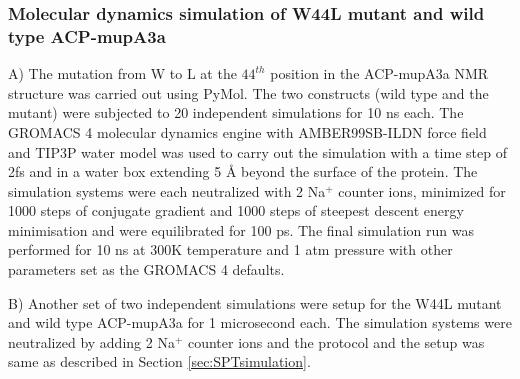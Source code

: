 			\subsubsection{Molecular dynamics simulation of W44L mutant and wild type ACP-mupA3a}
			\label{sec:WtoL_MD}
			A) The mutation from W to L at the $44^{th}$ position in the ACP-mupA3a NMR structure was carried out using PyMol. The two constructs (wild type and the mutant) were subjected to 20 independent simulations for 10 ns each. The GROMACS 4 \parencite{Hess2008a} molecular dynamics engine with AMBER99SB-ILDN \parencite{Lindorff-Larsen2010} force field and TIP3P water model was used to carry out the simulation with a time step of 2fs and in a water box extending 5 {\AA }  beyond the surface of the protein. The simulation systems were each neutralized with 2 Na$ ^{+} $ counter ions, minimized for 1000 steps of conjugate gradient and 1000 steps of steepest descent energy minimisation and were equilibrated for 100 ps. The final simulation run was performed for 10 ns at 300K temperature and 1 atm pressure with other parameters set as the GROMACS 4 defaults.
			
			B) Another set of two independent simulations were setup for the W44L mutant and wild type ACP-mupA3a for 1 microsecond each. The simulation systems were neutralized by adding 2 Na$ ^{+} $ counter ions and the protocol and the setup was same as described in Section \ref{sec:SPTsimulation}.
			
